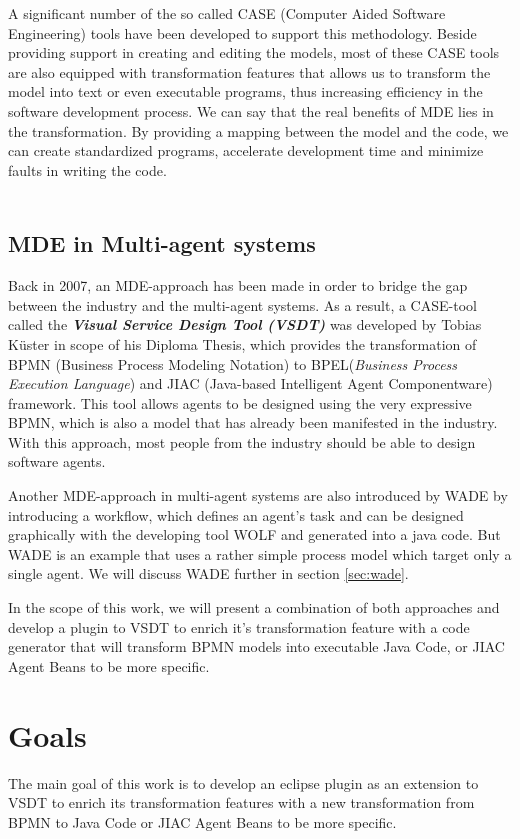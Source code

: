 A significant number of the so called  CASE (Computer Aided Software Engineering) tools have been developed to support this methodology. Beside providing support in creating and editing the models, most of these CASE tools are also equipped with transformation features that allows us to transform the model into text or even executable programs, thus increasing efficiency in the software development process. We can say that the real benefits of MDE lies in the transformation. By providing a mapping between the model and the code, we can create standardized programs, accelerate development time and minimize faults in writing the code. \\\\

\subsection{MDE in Multi-agent systems} 
Back in 2007, an MDE-approach has been made in order to bridge the gap between the industry and the multi-agent systems. As a result, a CASE-tool called the \textbf{\textit{Visual Service Design Tool (VSDT)}} was developed by Tobias K\"uster in scope of his Diploma Thesis, which provides the transformation of BPMN (Business Process Modeling Notation) to BPEL(\textit{Business Process Execution Language}) and JIAC (Java-based Intelligent Agent Componentware) framework. This tool allows agents to be designed using the very expressive BPMN, which is also a model that has already been manifested in the industry. With this approach, most people from the industry should be able to design software agents.

Another MDE-approach in multi-agent systems are also introduced by WADE by introducing a workflow, which defines an agent's task and can be designed graphically with the developing tool WOLF and generated into a java code. But WADE is an example that uses a rather simple process model which target only a single agent. We will discuss WADE further in section \ref{sec:wade}.

In the scope of this work, we will present a combination of both approaches and develop a plugin to VSDT to enrich it's transformation feature with a code generator that will transform BPMN models into executable Java Code, or JIAC Agent Beans to be more specific.

\section{Goals}
\label{sec:Goals}
The main goal of this work is to develop an eclipse plugin as an extension to VSDT to enrich its transformation features with a new transformation from BPMN to Java Code or JIAC Agent Beans to be more specific. \\

